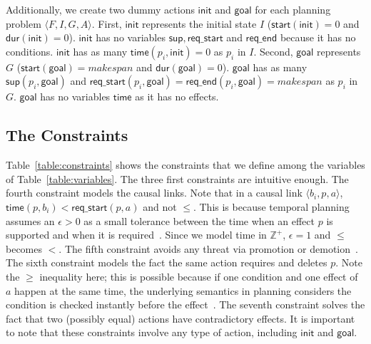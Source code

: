 \documentclass{ecai}
\newcommand{\tup}[1]{{\langle #1 \rangle}}
\newcommand{\dur}{\mathsf{dur}}    %
\newcommand{\obs}{\mathsf{obs}}    %
\newcommand{\start}{\mathsf{start}}%
\newcommand{\til}{\mathsf{til}}    %
\newcommand{\supp}{\mathsf{sup}}   %
\newcommand{\tim}{\mathsf{time}}   %
\newcommand{\reqs}{\mathsf{req\_{start}}} %
\newcommand{\reqe}{\mathsf{req\_{end}}}   %
\newcommand{\ini}{\mathsf{init}}   %
\newcommand{\goal}{\mathsf{goal}}  %
\begin{document}
Additionally, we create two dummy actions $\ini$ and $\goal$ for each planning problem $\tup{F,I,G,A}$. First, $\ini$ represents the initial state $I$ ($\start(\ini)=0$ and $\dur(\ini)=0$). $\ini$ has no variables $\supp, \reqs$ and $\reqe$ because it has no conditions. $\ini$ has as many $\tim(p_i,\ini)=0$ as $p_i$ in $I$. Second, $\goal$ represents $G$ ($\start(\goal)=makespan$ and $\dur(\goal)=0$). $\goal$ has as many $\supp(p_i,\goal)$ and $\reqs(p_i,\goal)=\reqe(p_i,\goal)=makespan$ as $p_i$ in $G$. $\goal$ has no variables $\tim$ as it has no effects.





\subsection{The Constraints}

Table~\ref{table:constraints} shows the constraints that we define among the variables of Table~\ref{table:variables}. The three first constraints are intuitive enough. The fourth constraint models the causal links. Note that in a causal link $\tup{b_i,p,a}$, $\tim(p,b_i) < \reqs(p,a)$ and not $\leq$. This is because temporal planning assumes an $\epsilon > 0$ as a small tolerance between the time when an effect $p$ is supported and when it is required~\cite{fox2003pddl2}. Since we model time in $\mathbb{Z}^+$, $\epsilon=1$ and $\leq$ becomes $<$.
The fifth constraint avoids any threat via promotion or demotion~\cite{ghallab2004automated}. The sixth constraint models the fact the same action requires and deletes $p$. Note the $\geq$ inequality here; this is possible because if one condition and one effect of $a$ happen at the same time, the underlying semantics in planning considers the condition is checked instantly before the effect~\cite{fox2003pddl2}. The seventh constraint solves the fact that two (possibly equal) actions have contradictory effects. It is important to note that these constraints involve any type of action, including $\ini$ and $\goal$.
\end{document}
